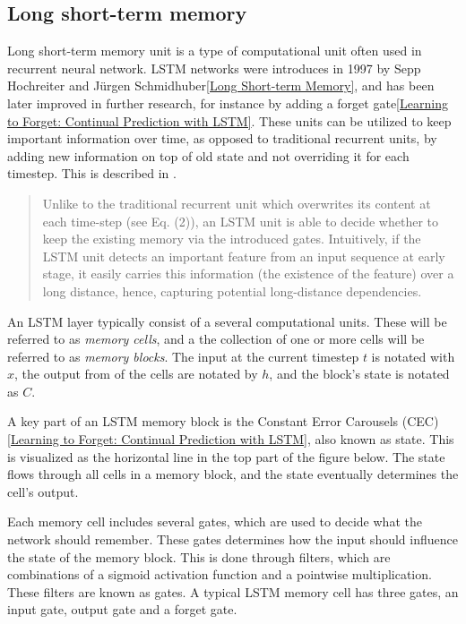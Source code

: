 \subsection{Long short-term memory}
Long short-term memory unit is a type of computational unit often used in recurrent neural network. LSTM networks were introduces in 1997 by Sepp Hochreiter and Jürgen Schmidhuber\ref{Long Short-term Memory}, and has been later improved in further research, for instance by adding a forget gate\ref{Learning to Forget: Continual Prediction with LSTM}. These units can be utilized to keep important information over time, as opposed to traditional recurrent units, by adding new information on top of old state and not overriding it for each timestep. This is described in \cite{Empirical evaluation of gated recurrent neural networks on sequence modeling}.

\begin{quote}
    Unlike to the traditional recurrent unit which overwrites its content at each time-step (see Eq. (2)),
    an LSTM unit is able to decide whether to keep the existing memory via the introduced gates.
    Intuitively, if the LSTM unit detects an important feature from an input sequence at early stage, it
    easily carries this information (the existence of the feature) over a long distance, hence, capturing
    potential long-distance dependencies.
\end{quote}

An LSTM layer typically consist of a several computational units. These will be referred to as \textit{memory cells}, and a the collection of one or more cells will be referred to as \textit{memory blocks}. The input at the current timestep $t$ is notated with $x$, the output from of the cells are notated by $h$, and the block's state is notated as $C$.

A key part of an LSTM memory block is the Constant Error Carousels (CEC) \ref{Learning to Forget: Continual Prediction with LSTM}, also known as state. This is visualized as the horizontal line in the top part of the figure below. The state flows through all cells in a memory block, and the state eventually determines the cell's output.

Each memory cell includes several gates, which are used to decide what the network should remember. These gates determines how the input should influence the state of the memory block. This is done through filters, which are combinations of a sigmoid activation function and a pointwise multiplication. These filters are known as gates. A typical LSTM memory cell has three gates, an input gate, output gate and a forget gate.


